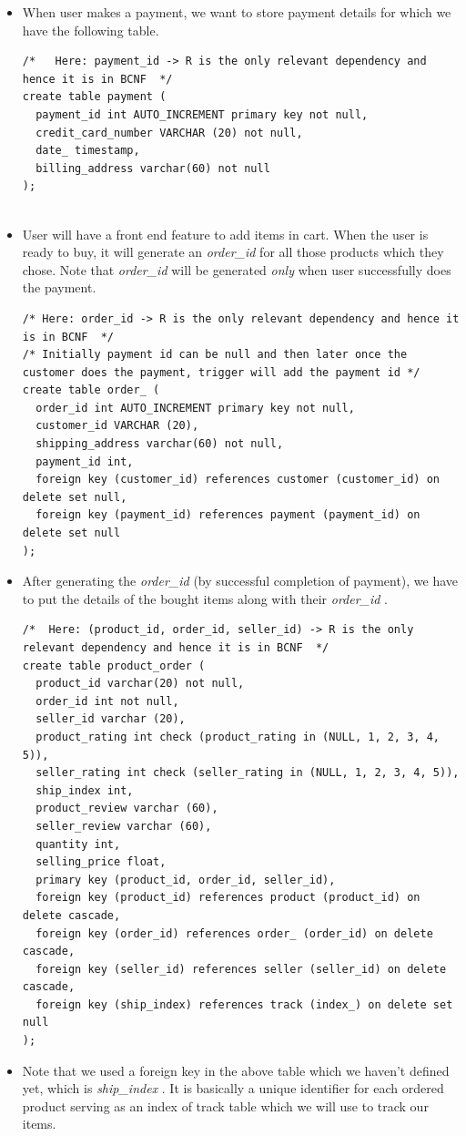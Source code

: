 \documentclass[a4paper,12pt]{article}
\newcommand{\ita}[1]{
    \textit{#1}
}
\begin{document}
\begin{itemize}
\begin{verbatim}
  \end{verbatim}
  \item When user makes a payment, we want to store payment details for which we have the following table.
  \begin{verbatim}
/*   Here: payment_id -> R is the only relevant dependency and hence it is in BCNF  */
create table payment (
  payment_id int AUTO_INCREMENT primary key not null,
  credit_card_number VARCHAR (20) not null,
  date_ timestamp,
  billing_address varchar(60) not null
);
    
  \end{verbatim}
  \item User will have a front end feature to add items in cart. When the user is ready to buy, it will generate an \ita{order\_id} for all those products which they chose. Note that \ita{order\_id} will be generated \ita{only} when user successfully does the payment.
  \begin{verbatim}
/* Here: order_id -> R is the only relevant dependency and hence it is in BCNF  */
/* Initially payment id can be null and then later once the customer does the payment, trigger will add the payment id */
create table order_ (
  order_id int AUTO_INCREMENT primary key not null,
  customer_id VARCHAR (20),
  shipping_address varchar(60) not null,
  payment_id int,
  foreign key (customer_id) references customer (customer_id) on delete set null,
  foreign key (payment_id) references payment (payment_id) on delete set null
);
  \end{verbatim}
  \item After generating the \ita{order\_id} (by successful completion of payment), we have to put the details of the bought items along with their \ita{order\_id}.
  \begin{verbatim}
/*  Here: (product_id, order_id, seller_id) -> R is the only relevant dependency and hence it is in BCNF  */
create table product_order (
  product_id varchar(20) not null,
  order_id int not null,
  seller_id varchar (20),
  product_rating int check (product_rating in (NULL, 1, 2, 3, 4, 5)),
  seller_rating int check (seller_rating in (NULL, 1, 2, 3, 4, 5)),
  ship_index int,
  product_review varchar (60),
  seller_review varchar (60),
  quantity int,
  selling_price float,
  primary key (product_id, order_id, seller_id),
  foreign key (product_id) references product (product_id) on delete cascade,
  foreign key (order_id) references order_ (order_id) on delete cascade,
  foreign key (seller_id) references seller (seller_id) on delete cascade,
  foreign key (ship_index) references track (index_) on delete set null
);
  \end{verbatim}
  \item Note that we used a foreign key in the above table which we haven't defined yet, which is \ita{ship\_index}. It is basically a unique identifier for each ordered product serving as an index of track table which we will use to track our items.
  \begin{verbatim}
    

\end{verbatim}
\end{itemize}
\end{document}
